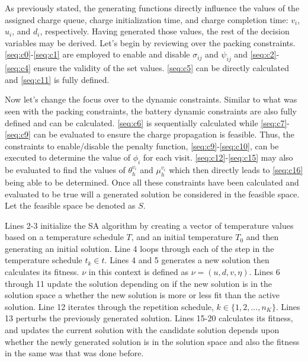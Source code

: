 \documentclass[11pt,a4paper,final]{article}
\newcommand{\Tau}{T}                        %
\begin{document}
As previously stated, the generating functions directly influence the values of the assigned charge queue, charge
initialization time, and charge completion time: \(v_i\), \(u_i\), and \(d_i\), respectively. Having generated those values,
the rest of the decision variables may be derived. Let's begin by reviewing over the packing constraints.
\ref{seq:c0}-\ref{seq:c1} are employed to enable and disable \(\sigma_{ij}\) and \(\psi_{ij}\) and \ref{seq:c2}-\ref{seq:c4} ensure
the validity of the set values. \ref{seq:c5} can be directly calculated and \ref{seq:c11} is fully defined.

Now let's change the focus over to the dynamic constraints. Similar to what was seen with the packing constraints, the
battery dynamic constraints are also fully defined and can be calculated. \ref{seq:c6} is sequentially calculated while
\ref{seq:c7}-\ref{seq:c9} can be evaluated to ensure the charge propagation is feasible. Thus, the constraints to
enable/disable the penalty function, \ref{seq:c9}-\ref{seq:c10}, can be executed to determine the value of \(\phi_i\) for
each visit. \ref{seq:c12}-\ref{seq:c15} may also be evaluated to find the values of \(\theta_h^{v_i}\) and \(\mu_h^{v_i}\) which
then directly leads to \ref{seq:c16} being able to be determined. Once all these constraints have been calculated and
evaluated to be true will a generated solution be considered in the feasible space. Let the feasible space be denoted as
\(S\).

Lines 2-3 initialize the SA algorithm by creating a vector of temperature values based on a temperature schedule \(\Tau\),
and an initial temperature \(\Tau_0\) and then generating an initial solution. Line 4 loops through each of the step in
the temperature schedule \(t_k \in t\). Lines 4 and 5 generates a new solution then calculates its fitness. \(\nu\) in this
context is defined as \(\nu = (u, d, v, \eta)\). Lines 6 through 11 update the solution depending on if the new solution is in
the solution space a whether the new solution is more or less fit than the active solution. Line 12 iterates through the
repetition schedule, \(k \in \{1, 2, ..., n_K\}\). Lines 13 perturbs the previously generated solution. Lines 15-20
calculates its fitness, and updates the current solution with the candidate solution depends upon whether the newly
generated solution is in the solution space and also the fitness in the same was that was done before.
\end{document}

